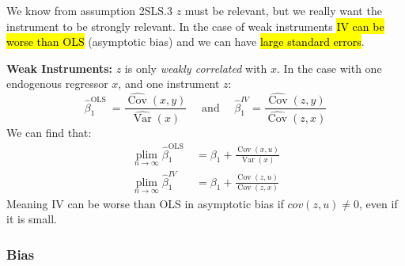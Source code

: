 \documentclass[11pt]{article}
\begin{document}
We know from assumption 2SLS.3 $z$ must be relevant, but we really want the instrument to be strongly relevant. In the case of weak instruments \hl{IV can be worse than OLS} (asymptotic bias) and we can have \hl{large standard errors}.
\begin{definition}
    \textbf{Weak Instruments:} $z$ is only \textit{weakly correlated} with $x$.
    In the case with one endogenous regressor $x$, and one instrument $z$:
    \begin{equation}
\hat{\beta}_1^{\text {OLS }}=\frac{\widehat{\operatorname{Cov}}(x, y)}{\widehat{\operatorname{Var}}(x)} \quad \text { and } \quad \hat{\beta}_1^{ IV}=\frac{\widehat{\operatorname{Cov}}(z, y)}{\widehat{\operatorname{Cov}}(z, x)}
\end{equation}
We can find that:
\begin{equation}
\begin{aligned}
\underset{n \rightarrow \infty}{\operatorname{plim}} \hat{\beta}_1^{\text {OLS }} & =\beta_1+\frac{\operatorname{Cov}(x, u)}{\operatorname{Var}(x)} \\
\underset{n \rightarrow \infty}{\operatorname{plim}}  \hat{\beta}_1^{IV} & =\beta_1+\frac{\operatorname{Cov}(z, u)}{\operatorname{Cov}(z, x)}
\end{aligned}
\end{equation}
Meaning IV can be worse than OLS in asymptotic bias if $cov(z,u)\neq0$, even if it is small.
\end{definition}
\subsubsection{Bias}
\end{document}
